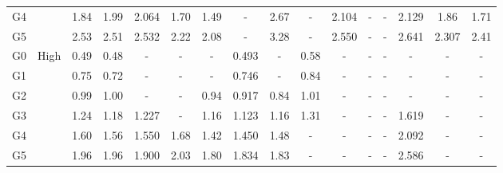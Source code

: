 \begin{landscape}
\begin{table}[t]
{\begin{tabular}{cccccccccccccccc}
G4     &                          & 1.84  & 1.99      &   2.064           & 1.70                      &   1.49                &-                      &   2.67                &   -                   &2.104                      &-                      &-                      &   2.129           &   1.86            &   1.71    \\
G5    &                          & 2.53  & 2.51      &   2.532           & 2.22                      &   2.08                &-                      &   3.28                &   -                   &2.550                      &-                      &-                      &   2.641           &   2.307           &   2.41    \\
\hline
G0   & \multirow{6}{*}{High}    & 0.49  & 0.48      &       -           & -                         &   -                   & 0.493                 &   -                   & 0.58                  &-                          &-                      &-                      &       -           &   -               &   -       \\
G1  &                          & 0.75  & 0.72      &       -           & -                         &   -                   & 0.746                 &   -                   & 0.84                  &-                          &-                      &-                      &       -           &   -               &   -       \\
G2     &                          & 0.99  & 1.00      &       -           & -                         &   0.94                & 0.917                 &   0.84                & 1.01                  &-                          &-                      &-                      &       -           &   -               &   -   \\
G3    &                          & 1.24  & 1.18      &   1.227           & -                         &   1.16                & 1.123                 &   1.16                & 1.31                  &-                          &-                      &-                      &   1.619           &   -               &   -       \\
G4   &                          & 1.60  & 1.56      &   1.550           & 1.68                      &   1.42                & 1.450                 &   1.48                & -                     &-                          &-                      &-                      &   2.092           &   -               &   -   \\
G5  &                          & 1.96  & 1.96      &   1.900           & 2.03                      &   1.80                & 1.834                 &   1.83                & -                     &-                          &-                      &-                      &   2.586           &   -               &   -   \\
\hline
\end{tabular}}
\label{tab:PAMAMRgValidacao}
\end{table}
\end{landscape}

